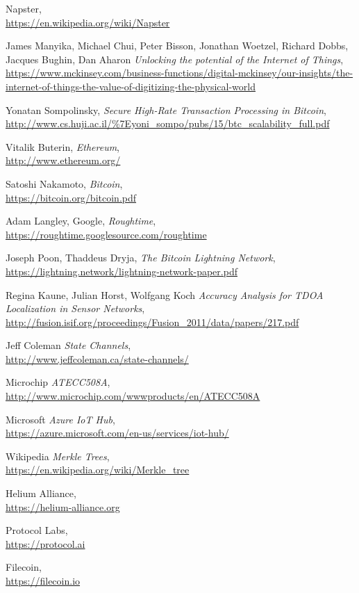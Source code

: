 \documentclass[letterpaper,11pt]{report}
\begin{document}
\begin{thebibliography}{9}

	Napster, \\
		\url{https://en.wikipedia.org/wiki/Napster}

	James Manyika, Michael Chui, Peter Bisson, Jonathan Woetzel, Richard Dobbs, Jacques Bughin, Dan Aharon
		\textit{Unlocking the potential of the Internet of Things}, \\
		\url{https://www.mckinsey.com/business-functions/digital-mckinsey/our-insights/the-internet-of-things-the-value-of-digitizing-the-physical-world}

	Yonatan Sompolinsky,
		\textit{Secure High-Rate Transaction Processing in Bitcoin}, \\
		\url{http://www.cs.huji.ac.il/\%7Eyoni\_sompo/pubs/15/btc\_scalability\_full.pdf}

	Vitalik Buterin,
		\textit{Ethereum},\\
		\url{http://www.ethereum.org/}

	Satoshi Nakamoto,
		\textit{Bitcoin}, \\
		\url{https://bitcoin.org/bitcoin.pdf}

	Adam Langley, Google,
		\textit{Roughtime}, \\
		\url{https://roughtime.googlesource.com/roughtime}

	Joseph Poon, Thaddeus Dryja,
		\textit{The Bitcoin Lightning Network}, \\
		\url{https://lightning.network/lightning-network-paper.pdf}

	Regina Kaune, Julian Horst, Wolfgang Koch
		\textit{Accuracy Analysis for TDOA Localization in Sensor Networks}, \\
		\url{http://fusion.isif.org/proceedings/Fusion_2011/data/papers/217.pdf}	

	Jeff Coleman
		\textit{State Channels}, \\
		\url{http://www.jeffcoleman.ca/state-channels/}

	Microchip
		\textit{ATECC508A}, \\
		\url{http://www.microchip.com/wwwproducts/en/ATECC508A}

	Microsoft
		\textit{Azure IoT Hub}, \\
		\url{https://azure.microsoft.com/en-us/services/iot-hub/}

	Wikipedia
		\textit{Merkle Trees}, \\
		\url{https://en.wikipedia.org/wiki/Merkle_tree}

	Helium Alliance, \\
		\url{https://helium-alliance.org}

	Protocol Labs, \\
		\url{https://protocol.ai}

	Filecoin, \\
		\url{https://filecoin.io}

\end{thebibliography}
\end{document}
